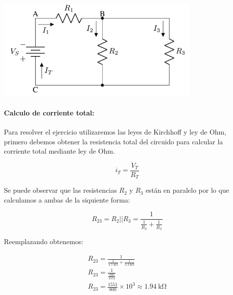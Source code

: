 \documentclass[a4paper,12pt]{article}
\begin{document}
\paragraph{}
\paragraph{}
\includegraphics[width=10cm]{imagenes/circuito.png}\\[1.5cm]

\paragraph{Calculo de corriente total:}
\paragraph{}
Para resolver el ejercicio utilizaremos las leyes de Kirchhoff y ley de Ohm, primero debemos obtener la resistencia total del circuido para calcular la corriente total mediante ley de Ohm.

\begin{equation*}
    i_T = \frac{V_T}{R_T}
\end{equation*}

\vspace{1cm}

Se puede observar que las resistencias $R_2$ y $R_3$ están en paralelo por lo que calculamos a ambas de la siquiente forma:

\begin{equation*}
    R_{23} = R_2 || R_3 = \frac{1}{\frac{1}{R_2}+\frac{1}{R_3}}
\end{equation*}

Reemplazando obtenemos:

\begin{align*}
      R_{23} = \frac{1}{\frac{1}{\SI{4.7}{\kilo\ohm}}+\frac{1}{\SI{3.3}{\kilo\ohm}}} \\[0.5cm]
      R_{23} = \frac{1}{\frac{800}{1551}} \\[0.5cm]
      R_{23} = \frac{1551}{800}\times10^3 \approx \SI{1.94}{\kilo\ohm}
\end{align*}
\end{document}
